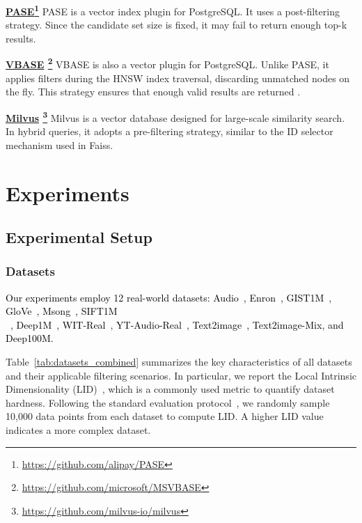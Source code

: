\documentclass[sigconf, nonacm, pdfa]{acmart}
\begin{document}
{\noindent\textbf{\underline{PASE}\footnote{\url{https://github.com/alipay/PASE}}} \cite{pase}  PASE is a vector index plugin for PostgreSQL. It uses a post-filtering strategy. Since the candidate set size is fixed, it may fail to return enough top-k results.

\noindent\textbf{\underline{VBASE} \footnote{\url{https://github.com/microsoft/MSVBASE}}} \cite{vbase} VBASE is also a vector plugin for PostgreSQL. Unlike PASE, it applies filters during the HNSW index traversal, discarding unmatched nodes on the fly. This strategy ensures that enough valid results are returned .



\noindent\textbf{\underline{Milvus} \footnote{\url{https://github.com/milvus-io/milvus}}}  \cite{milvus} Milvus is a vector database designed for large-scale similarity search. In hybrid queries, it adopts a pre-filtering strategy, similar to the ID selector mechanism used in Faiss.

	
	\section{Experiments}
	\subsection{Experimental Setup}
	\subsubsection{Datasets}
	
	\textcolor{black}{Our experiments employ 12 real-world datasets: Audio~\cite{audio_unknown},  Enron~\cite{enron2015}, GIST1M~\cite{sift2010}, GloVe~\cite{GloVe2015}, Msong~\cite{msong2011}, SIFT1M\\~\cite{sift2010}, Deep1M~\cite{yandex_deep_dataset}, WIT-Real~\cite{wit_dataset}, YT-Audio-Real~\cite{youtube8m_dataset}, Text2image~\cite{texttoimage}, Text2image-Mix, and Deep100M.}
	
	Table~\ref{tab:datasets_combined} summarizes the key characteristics of all datasets and their applicable filtering scenarios. In particular, we report the Local Intrinsic Dimensionality (LID)~\cite{Lid}, which is a commonly used metric to quantify dataset hardness. Following the standard evaluation protocol~\cite{LID2}, we randomly sample 10,000 data points from each dataset to compute LID.  A higher LID value indicates a more complex dataset.
	
}
\end{document}
